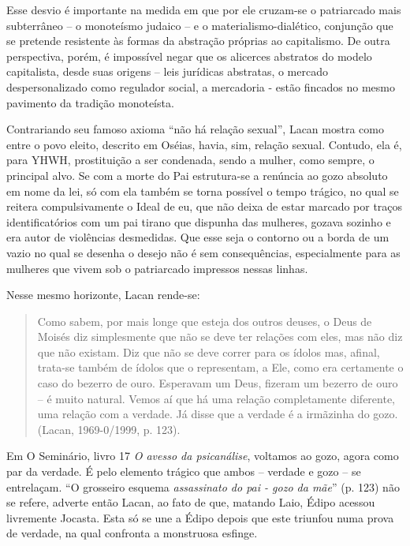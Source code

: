 Esse desvio é importante na medida em que por ele cruzam-se o
patriarcado mais subterrâneo -- o monoteísmo judaico -- e o
materialismo-dialético, conjunção que se pretende resistente às formas
da abstração próprias ao capitalismo. De outra perspectiva, porém, é
impossível negar que os alicerces abstratos do modelo capitalista, desde
suas origens -- leis jurídicas abstratas, o mercado despersonalizado
como regulador social, a mercadoria - estão fincados no mesmo pavimento
da tradição monoteísta.

Contrariando seu famoso axioma ``não há relação sexual'', Lacan mostra
como entre o povo eleito, descrito em Oséias, havia, sim, relação
sexual. Contudo, ela é, para YHWH, prostituição a ser condenada, sendo a
mulher, como sempre, o principal alvo. Se com a morte do Pai
estrutura-se a renúncia ao gozo absoluto em nome da lei, só com ela
também se torna possível o tempo trágico, no qual se reitera
compulsivamente o Ideal de eu, que não deixa de estar marcado por traços
identificatórios com um pai tirano que dispunha das mulheres, gozava
sozinho e era autor de violências desmedidas. Que esse seja o contorno
ou a borda de um vazio no qual se desenha o desejo não é sem
consequências, especialmente para as mulheres que vivem sob o
patriarcado impressos nessas linhas.

Nesse mesmo horizonte, Lacan rende-se:

\begin{quote}
Como sabem, por mais longe que esteja dos outros deuses, o Deus de
Moisés diz simplesmente que não se deve ter relações com eles, mas não
diz que não existam. Diz que não se deve correr para os ídolos mas,
afinal, trata-se também de ídolos que o representam, a Ele, como era
certamente o caso do bezerro de ouro. Esperavam um Deus, fizeram um
bezerro de ouro -- é muito natural. Vemos aí que há uma relação
completamente diferente, uma relação com a verdade. Já disse que a
verdade é a irmãzinha do gozo. (Lacan, 1969-0/1999, p. 123).
\end{quote}

Em O Seminário, livro 17 \emph{O avesso da psicanálise}, voltamos ao
gozo, agora como par da verdade. É pelo elemento trágico que ambos --
verdade e gozo -- se entrelaçam. ``O grosseiro esquema \emph{assassinato
do pai - gozo da mãe}'' (p. 123) não se refere, adverte então Lacan, ao
fato de que, matando Laio, Édipo acessou livremente Jocasta. Esta só se
une a Édipo depois que este triunfou numa prova de verdade, na qual
confronta a monstruosa esfinge.

